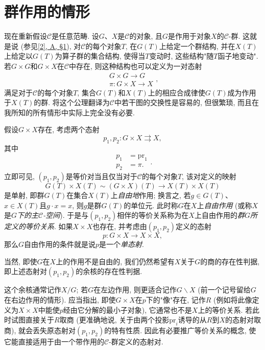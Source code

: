 \chapter{群作用的情形}\thispagestyle{fancy}\label{fga3.iii-3}
\par{}现在重新假设\(\mathcal {C}\)是任意范畴. 设\(G\)、\(X\)是\(\mathcal {C}\)的对象, 且\(G\)是作用于对象\(X\)的\(\mathcal {C}\)-群. 这就是说 (参见\hyperref[fga3.ii-a.1]{[2], A, §1}), 对\(\mathcal {C}\)的每个对象\(T\), 在\(G(T)\)上给定一个群结构, 并在\(X(T)\)上给定以\(G(T)\)为算子群的集合结构, 使得当\(T\)变动时, 这些结构"随\(T\)函子地变动". 若\(G\times  G\)和\(G\times  X\)在\(\mathcal {C}\)中存在, 则这种结构也可以定义为一对态射\[     
\begin {gathered}       G\times  G\to  G     \\\pi \colon  G\times  X\to  X     
\end {gathered},\] 满足对于\(\mathcal {C}\)的每个对象\(T\), 集合\(G(T)\)和\(X(T)\)上的相应合成律使\(G(T)\)成为作用于\(X(T)\)的群. 将这个公理翻译为\(\mathcal {C}\)中若干图的交换性是容易的, 但很繁琐, 而且在我所知的所有情形中实际上完全没有必要.
\par{}假设\(G\times  X\)存在, 考虑两个态射\[     p_1,p_2\colon  G\times  X\rightrightarrows  X,\] 其中\[     
\begin {aligned}       p_1 &= \mathrm {pr}_1     \\p_2 &= \pi .     
\end {aligned}.\] 立即可见, \((p_1,p_2)\)是等价对当且仅当对于\(\mathcal {C}\)的每个对象\(T\), 该对定义的映射\[     G(T)\times  X(T)     \sim  (G\times  X)(T) \to  X(T)\times  X(T)   \]是单射, 即群\(G(T)\)在集合\(X(T)\)上\emph{自由地}作用; 换言之, 若\(g\in  G(T)\)、\(x\in  X(T)\)且\(g\cdot  x=x\), 则\(g\)是群\(G(T)\)的单位元. 此时称\(G\)在\(X\)上\emph{自由作用} (或称\(X\)是\emph{\(G\)下的主\(\mathcal {C}\)-空间}). 于是与\((p_1,p_2)\)相伴的等价关系称为在\(X\)上自由作用的\emph{群\(G\)所定义的等价关系}. 如果\(X\times  X\)也存在, 并考虑由\((p_1,p_2)\)定义的态射\[     p\colon  G\times  X\to  X\times  X,\] 那么\(G\)自由作用的条件就是说\(p\)是一个\emph{单态射}.
\par{}当然, 即使\(G\)在\(X\)上的作用不是自由的, 我们仍然希望有\(X\)关于\(G\)的商的存在性判据, 即上述态射对\((p_1,p_2)\)的余核的存在性判据.
\par{}这个余核通常记作\(X/G\); 若\(G\)在左边作用, 则更适合记作\(G\backslash  X\) (前一个记号留给\(G\)在右边作用的情形). 应当指出, 即使\(G\times  X\)在\(p\)下的"像"存在, 记作\(R\) (例如将此像定义为\(X\times  X\)中能使\(p\)经由它分解的最小子对象), 它通常也不是\(X\)上的等价关系. 若此时试图直接关于\(R\)取商 (更准确地说, 关于由两个投影\(\mathrm {pr}_i\)诱导的从\(R\)到\(X\)的态射对取商), 就会丢失原态射对\((p_1,p_2)\)的特有性质. 因此有必要推广等价关系的概念, 使它能直接适用于由一个带作用的\(\mathcal {C}\)-群定义的态射对.
